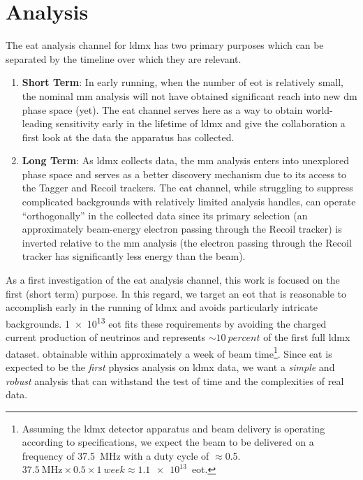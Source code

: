 \chapter{Analysis}
\label{chapter:ldmx:analysis}

The \ac{eat} analysis channel for \ac{ldmx} has two primary purposes which can
be separated by the timeline over which they are relevant.
\begin{enumerate}
	\item \textbf{Short Term}: In early running, when the number of \ac{eot} is
	      relatively small, the nominal \ac{mm} analysis will not have obtained
	      significant reach into new \ac{dm} phase space (yet). The \ac{eat} channel
	      serves here as a way to obtain world-leading sensitivity early in the lifetime
	      of \ac{ldmx} and give the collaboration a first look at the data the apparatus
	      has collected.
	\item \textbf{Long Term}: As \ac{ldmx} collects data, the \ac{mm}
	      analysis enters into unexplored phase space and serves as a better discovery
	      mechanism due to its access to the Tagger and Recoil trackers. The \ac{eat}
	      channel, while struggling to suppress complicated backgrounds with relatively
	      limited analysis handles, can operate ``orthogonally'' in the collected data
	      since its primary selection (an approximately beam-energy electron passing
	      through the Recoil tracker) is inverted relative to the \ac{mm} analysis
	      (the electron passing through the Recoil tracker has significantly less
	      energy than the beam).
\end{enumerate}
As a first investigation of the \ac{eat} analysis channel, this work is focused on
the first (short term) purpose. In this regard, we target an \ac{eot} that is reasonable
to accomplish early in the running of \ac{ldmx} and avoids particularly intricate backgrounds.
\num{1e13} \ac{eot} fits these requirements by avoiding the charged current production
of neutrinos and represents $\sim\qty{10}{percent}$ of the first full \ac{ldmx} dataset.
obtainable within approximately a week of beam time\footnote{
	Assuming the \ac{ldmx} detector apparatus and beam delivery is operating according to specifications, we expect the beam to be delivered on a frequency of \qty{37.5}{\mega\hertz} with a duty cycle of $\approx$\num{0.5}.
	$\qty{37.5}{\mega\hertz}\times0.5\times\qty{1}{week}\approx\num{1.1e13}$~\ac{eot}.
}.
Since \ac{eat} is expected to be the \emph{first} physics
analysis on \ac{ldmx} data, we want a \emph{simple} and \emph{robust} analysis that can withstand
the test of time and the complexities of real data.

